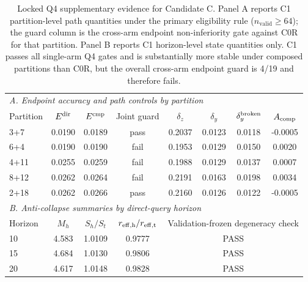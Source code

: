 \begin{table}[!t]
\centering
\small
\setlength{\tabcolsep}{2.1pt}
\begin{tabular}{lccccccc}
\toprule
\multicolumn{8}{l}{\emph{A. Endpoint accuracy and path controls by partition}}\\
Partition & $E^{\rm dir}$ & $E^{\rm cmp}$ & Joint guard &
$\delta_z$ & $\delta_y$ & $\delta_y^{\rm broken}$ & $A_{\rm comp}$\\
\midrule
3+7 & 0.0190 & 0.0189 & pass & 0.2037 & 0.0123 & 0.0118 & -0.0005\\
6+4 & 0.0190 & 0.0190 & fail & 0.1953 & 0.0129 & 0.0150 & 0.0020\\
4+11 & 0.0255 & 0.0259 & fail & 0.1988 & 0.0129 & 0.0137 & 0.0007\\
8+12 & 0.0262 & 0.0264 & fail & 0.2191 & 0.0163 & 0.0198 & 0.0034\\
2+18 & 0.0262 & 0.0266 & pass & 0.2160 & 0.0126 & 0.0122 & -0.0005\\
\midrule
\multicolumn{8}{l}{\emph{B. Anti-collapse summaries by direct-query horizon}}\\
Horizon & $M_h$ & $S_h/S_t$ & $r_{\rm eff,h}/r_{\rm eff,t}$ &
\multicolumn{4}{c}{Validation-frozen degeneracy check}\\
\midrule
10 & 4.583 & 1.0109 & 0.9777 & \multicolumn{4}{c}{PASS}\\
15 & 4.684 & 1.0130 & 0.9806 & \multicolumn{4}{c}{PASS}\\
20 & 4.617 & 1.0148 & 0.9828 & \multicolumn{4}{c}{PASS}\\
\bottomrule
\end{tabular}
\caption{Locked Q4 supplementary evidence for Candidate C. Panel A reports C1
partition-level path quantities under the primary eligibility rule
($n_{\mathrm{valid}}\ge64$); the guard column is the cross-arm endpoint
non-inferiority gate against C0R for that partition. Panel B reports C1
horizon-level state quantities only. C1 passes all single-arm Q4 gates and is
substantially more stable under composed partitions than C0R, but the overall
cross-arm endpoint guard is 4/19 and therefore fails.}
\label{tab:composition}
\end{table}
